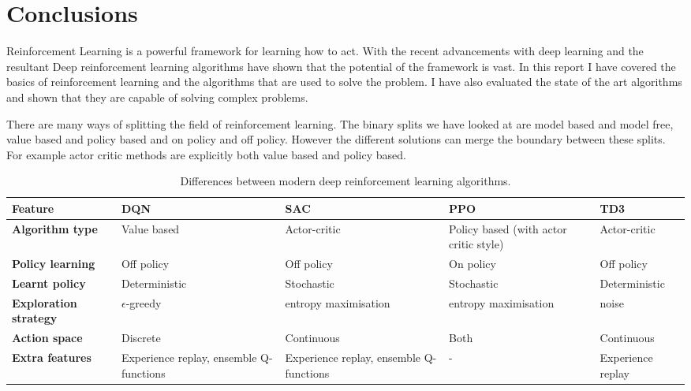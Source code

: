\chapter{Conclusions}\label{C:con}

Reinforcement Learning is a powerful framework for learning how to act. With the recent advancements with deep learning and the resultant Deep reinforcement learning algorithms have shown that the potential of the framework is vast. In this report I have covered the basics of reinforcement learning and the algorithms that are used to solve the problem. I have also evaluated the state of the art algorithms and shown that they are capable of solving complex problems. 

There are many ways of splitting the field of reinforcement learning. The binary splits we have looked at are model based and model free, value based and policy based and on policy and off policy. However the different solutions can merge the boundary between these splits. For example actor critic methods are explicitly both value based and policy based.



\begin{table}[h]
    \footnotesize
    \centering
    \renewcommand{\arraystretch}{1.4} %
    \begin{tabularx}{\textwidth}{p{1.3cm} X X X X}
        \hline
        \textbf{Feature} & \textbf{DQN} & \textbf{SAC} & \textbf{PPO} & \textbf{TD3} \\
        \hline
        \textbf{Algorithm type}       & Value based      & Actor-critic         & Policy based (with actor critic style)              & Actor-critic  \\
        \textbf{Policy learning}      & Off policy        & Off policy           & On policy            & Off policy    \\
        \textbf{Learnt policy}        & Deterministic     & Stochastic           & Stochastic           & Deterministic \\
        \textbf{Exploration strategy} & $\epsilon$-greedy & entropy maximisation & entropy maximisation & noise         \\
        \textbf{Action space}         & Discrete          & Continuous           & Both                 & Continuous    \\
        \textbf{Extra features} & Experience replay, ensemble Q-functions & Experience replay, ensemble Q-functions & - & Experience replay \\
        \hline
    \end{tabularx}
    \caption{Differences between modern deep reinforcement learning algorithms.}
\end{table}


